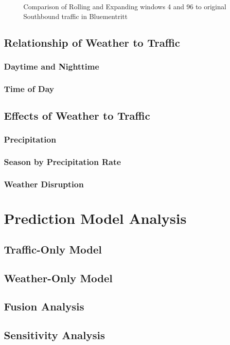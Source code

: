 \begin{figure}
    \centering
      \captionsetup{justification=centering}
    \hfill
    \caption{Comparison of Rolling and Expanding windows 4 and 96 to original Southbound traffic in Bluementritt}
\end{figure}


\subsection{Relationship of Weather to Traffic}
\subsubsection{Daytime and Nighttime}
\subsubsection{Time of Day}


\subsection{Effects of Weather to Traffic}
\subsubsection{Precipitation}
\subsubsection{Season by Precipitation Rate}
\subsubsection{Weather Disruption}



\section{Prediction Model Analysis}

\subsection{Traffic-Only Model}
\subsection{Weather-Only Model}
\subsection{Fusion Analysis}
\subsection{Sensitivity Analysis}